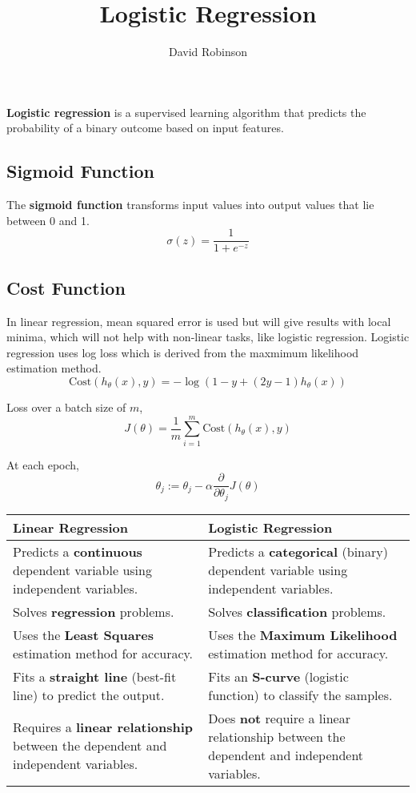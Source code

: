 \documentclass{article}
\title{Logistic Regression}
\author{David Robinson}
\date{}
\begin{document}
\maketitle

\textbf{Logistic regression} is a supervised learning algorithm that predicts the probability of a binary outcome based on input features.

\subsection*{Sigmoid Function}

The \textbf{sigmoid function} transforms input values into output values that lie between 0 and 1.
\[\sigma(z)=\frac{1}{1+e^{-z}}\]

\subsection*{Cost Function}

In linear regression, mean squared error is used but will give results with local minima, which will not help with non-linear tasks, like logistic regression. Logistic regression uses log loss which is derived from the maxmimum likelihood estimation method.
\[\text{Cost}(h_\theta(x),y)=-\log(1-y+(2y-1)h_\theta(x))\]

Loss over a batch size of $m$,
\[J(\theta)=\frac{1}{m}\sum_{i=1}^m \text{Cost}(h_\theta(x),y)\]


At each epoch,
\[\theta_j := \theta_j-\alpha\frac{\partial}{\partial\theta_j}J(\theta)\]
\vspace{1em}
\centering
\renewcommand{\arraystretch}{1.5}
\begin{tabularx}{\textwidth}{|X|X|}
    \hline
    \textbf{Linear Regression} & \textbf{Logistic Regression} \\
    \hline
    Predicts a \textbf{continuous} dependent variable using independent variables. & Predicts a \textbf{categorical} (binary) dependent variable using independent variables. \\
    \hline
    Solves \textbf{regression} problems. & Solves \textbf{classification} problems. \\
    \hline
    Uses the \textbf{Least Squares} estimation method for accuracy. & Uses the \textbf{Maximum Likelihood} estimation method for accuracy. \\
    \hline
    Fits a \textbf{straight line} (best-fit line) to predict the output. & Fits an \textbf{S-curve} (logistic function) to classify the samples. \\
    \hline
    Requires a \textbf{linear relationship} between the dependent and independent variables. & Does \textbf{not} require a linear relationship between the dependent and independent variables. \\
    \hline
\end{tabularx}
\end{document}
